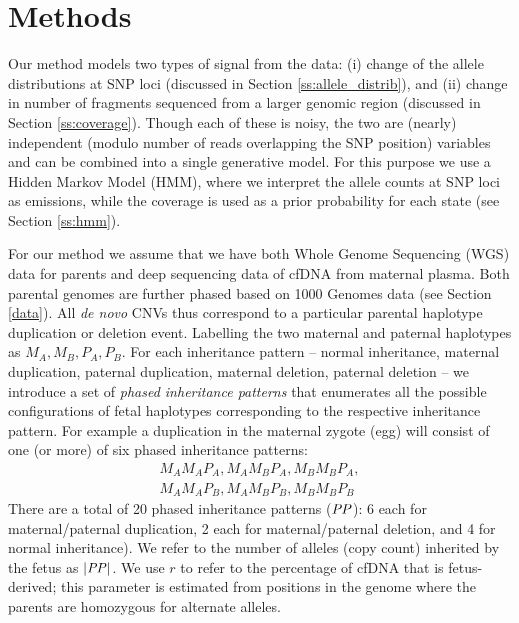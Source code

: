 \section{Methods}
Our method models two types of signal from the data: (i) change of the allele distributions at SNP loci (discussed in Section \ref{ss:allele_distrib}), and (ii) change in number of fragments sequenced from a larger genomic region (discussed in Section \ref{ss:coverage}). Though each of these is noisy, the two are (nearly) independent (modulo number of reads overlapping the SNP position) variables and can be combined into a single generative model. For this purpose we use a Hidden Markov Model (HMM), where we interpret the allele counts at SNP loci as emissions, while the coverage is used as a prior probability for each state (see Section \ref{ss:hmm}). 

For our method we assume that we have both Whole Genome Sequencing (WGS) data for parents and deep sequencing data of cfDNA from maternal plasma. Both parental genomes are further phased based on 1000 Genomes data (see Section \ref{data}). All \textit{de novo} CNVs thus correspond to a particular parental haplotype duplication or deletion event. Labelling the two maternal and paternal haplotypes as $M_A,M_B,P_A,P_B$. For each inheritance pattern -- normal inheritance, maternal duplication, paternal duplication, maternal deletion, paternal deletion -- we introduce a set of \textit{phased inheritance patterns} that enumerates all the possible configurations of fetal haplotypes corresponding to the respective inheritance pattern. For example a duplication in the maternal zygote (egg) will consist of one (or more) 
of  six phased inheritance patterns:
\begin{align*}
M_AM_AP_A, M_AM_BP_A, M_BM_BP_A,\\
M_AM_AP_B, M_AM_BP_B, M_BM_BP_B
\end{align*}
There are a total of 20 phased inheritance patterns ($\mathit{PP}$): 6 each for maternal/paternal duplication, 2 each for maternal/paternal deletion, and 4 for normal inheritance). We refer to the number of alleles (copy count) inherited by the fetus as $|\mathit{PP}|$. We use $r$ to refer to the percentage of cfDNA that is fetus-derived; this parameter is estimated from positions in the genome where the parents are homozygous for alternate alleles.

